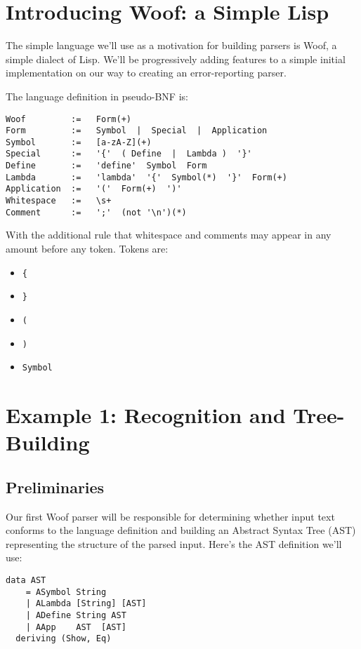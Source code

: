 \documentclass{tmr}
\begin{document}
\section{Introducing Woof:  a Simple Lisp}


The simple language we'll use as a motivation for building parsers is Woof, a 
simple dialect of Lisp.  We'll be progressively adding features to a simple 
initial implementation on our way to creating an error-reporting parser.

The language definition in pseudo-BNF \cite{bnf} is:

\begin{verbatim}
Woof         :=   Form(+)
Form         :=   Symbol  |  Special  |  Application
Symbol       :=   [a-zA-Z](+)
Special      :=   '{'  ( Define  |  Lambda )  '}'
Define       :=   'define'  Symbol  Form
Lambda       :=   'lambda'  '{'  Symbol(*)  '}'  Form(+)
Application  :=   '('  Form(+)  ')'
Whitespace   :=   \s+
Comment      :=   ';'  (not '\n')(*)
\end{verbatim}

With the additional rule that whitespace and comments may appear in any 
amount before any token.  Tokens are:
\begin{itemize}
  \item \verb+{+
  \item \verb+}+
  \item \verb+(+
  \item \verb+)+
  \item \verb+Symbol+
\end{itemize}




\section{Example 1: Recognition and Tree-Building}

\subsection{Preliminaries}
Our first Woof parser will be responsible for determining whether input
text conforms to the language definition and building an 
Abstract Syntax Tree (AST) representing the structure of the parsed input.
Here's the AST definition we'll use:
\begin{verbatim}
data AST
    = ASymbol String
    | ALambda [String] [AST]
    | ADefine String AST
    | AApp    AST  [AST]
  deriving (Show, Eq)
\end{verbatim}
\end{document}
